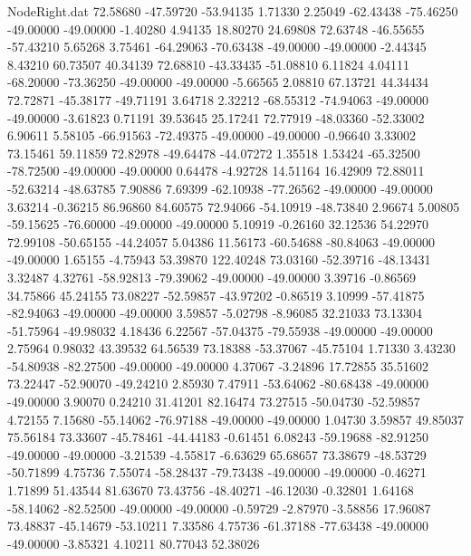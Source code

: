 \begin{filecontents}{NodeRight.dat}
  72.58680  -47.59720  -53.94135     1.71330    2.25049  -62.43438  -75.46250  -49.00000  -49.00000   -1.40280    4.94135   18.80270   24.69808
  72.63748  -46.55655  -57.43210     5.65268    3.75461  -64.29063  -70.63438  -49.00000  -49.00000   -2.44345    8.43210   60.73507   40.34139
  72.68810  -43.33435  -51.08810     6.11824    4.04111  -68.20000  -73.36250  -49.00000  -49.00000   -5.66565    2.08810   67.13721   44.34434
  72.72871  -45.38177  -49.71191     3.64718    2.32212  -68.55312  -74.94063  -49.00000  -49.00000   -3.61823    0.71191   39.53645   25.17241
  72.77919  -48.03360  -52.33002     6.90611    5.58105  -66.91563  -72.49375  -49.00000  -49.00000   -0.96640    3.33002   73.15461   59.11859
  72.82978  -49.64478  -44.07272     1.35518    1.53424  -65.32500  -78.72500  -49.00000  -49.00000    0.64478   -4.92728   14.51164   16.42909
  72.88011  -52.63214  -48.63785     7.90886    7.69399  -62.10938  -77.26562  -49.00000  -49.00000    3.63214   -0.36215   86.96860   84.60575
  72.94066  -54.10919  -48.73840     2.96674    5.00805  -59.15625  -76.60000  -49.00000  -49.00000    5.10919   -0.26160   32.12536   54.22970
  72.99108  -50.65155  -44.24057     5.04386   11.56173  -60.54688  -80.84063  -49.00000  -49.00000    1.65155   -4.75943   53.39870  122.40248
  73.03160  -52.39716  -48.13431     3.32487    4.32761  -58.92813  -79.39062  -49.00000  -49.00000    3.39716   -0.86569   34.75866   45.24155
  73.08227  -52.59857  -43.97202    -0.86519    3.10999  -57.41875  -82.94063  -49.00000  -49.00000    3.59857   -5.02798   -8.96085   32.21033
  73.13304  -51.75964  -49.98032     4.18436    6.22567  -57.04375  -79.55938  -49.00000  -49.00000    2.75964    0.98032   43.39532   64.56539
  73.18388  -53.37067  -45.75104     1.71330    3.43230  -54.80938  -82.27500  -49.00000  -49.00000    4.37067   -3.24896   17.72855   35.51602
  73.22447  -52.90070  -49.24210     2.85930    7.47911  -53.64062  -80.68438  -49.00000  -49.00000    3.90070    0.24210   31.41201   82.16474
  73.27515  -50.04730  -52.59857     4.72155    7.15680  -55.14062  -76.97188  -49.00000  -49.00000    1.04730    3.59857   49.85037   75.56184
  73.33607  -45.78461  -44.44183    -0.61451    6.08243  -59.19688  -82.91250  -49.00000  -49.00000   -3.21539   -4.55817   -6.63629   65.68657
  73.38679  -48.53729  -50.71899     4.75736    7.55074  -58.28437  -79.73438  -49.00000  -49.00000   -0.46271    1.71899   51.43544   81.63670
  73.43756  -48.40271  -46.12030    -0.32801    1.64168  -58.14062  -82.52500  -49.00000  -49.00000   -0.59729   -2.87970   -3.58856   17.96087
  73.48837  -45.14679  -53.10211     7.33586    4.75736  -61.37188  -77.63438  -49.00000  -49.00000   -3.85321    4.10211   80.77043   52.38026

\end{filecontents}
